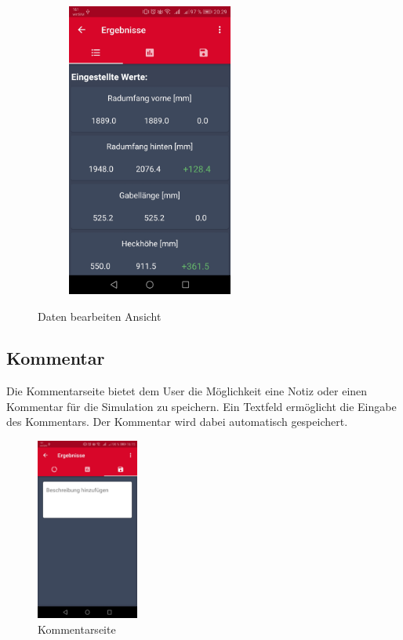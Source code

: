 \begin{figure}[H]
\begin{subfigure}[b]{0.5\textwidth}
		\includegraphics[width=0.6\textwidth]{../include/images/funktionalitaet/einval}
	\end{subfigure}		
	
	\caption{Daten bearbeiten Ansicht}
\end{figure}
		\subsection{Kommentar}
		\label{subsec:comment}
		Die Kommentarseite bietet dem User die Möglichkeit eine Notiz oder einen Kommentar für die Simulation zu speichern. Ein Textfeld ermöglicht die Eingabe des Kommentars. Der Kommentar wird dabei automatisch gespeichert.
	\begin{figure}[H]
	\centering
		\includegraphics[width=0.3\textwidth]{../include/images/funktionalitaet/Kommentar}
	
	\caption{Kommentarseite}
\end{figure}
	
	
		